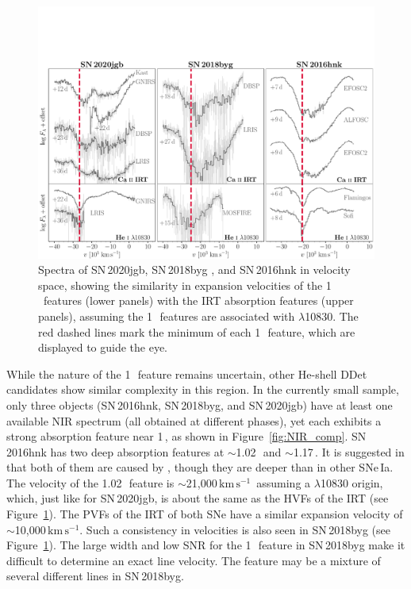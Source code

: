 \documentclass[twocolumn]{aastex631}
\newcommand{\sn}{SN\,2020jgb}
\newcommand{\kms}{$\mathrm{km}\,\mathrm{s}^{-1}$}
\begin{document}
\begin{figure}
    \centering
    \includegraphics[width=\textwidth]{CaII_HeI_hvf.pdf}
    \caption{Spectra of \sn, SN\,2018byg \citep{de_18byg_2019}, and SN\,2016hnk \citep{galbany_16hnk_2019} in velocity space, showing the similarity in expansion velocities of the 1\,\micron\ features (lower panels) with the  IRT absorption features (upper panels), assuming the 1\,\micron\ features are associated with  $\lambda$10830. The red dashed lines mark the minimum of each 1\,\micron\ feature, which are displayed to guide the eye.}
    \label{fig:hvf_comp}
\end{figure}

While the nature of the 1\,\micron\ feature remains uncertain, other He-shell DDet candidates show similar complexity in this region. In the currently small sample, only three objects (SN\,2016hnk, SN\,2018byg, and \sn) have at least one available NIR spectrum (all obtained at different phases), yet each exhibits a strong absorption feature near 1\,\micron, as shown in Figure~\ref{fig:NIR_comp}. SN\,2016hnk has two deep absorption features at $\sim$1.02\,\micron\ and $\sim$1.17\,\micron. It is suggested in \citet{galbany_16hnk_2019} that both of them are caused by , though they are deeper than in other SNe\,Ia. The velocity of the 1.02\,\micron\ feature is $\sim$21,000\,\kms\ assuming a  $\lambda$10830 origin, which, just like for \sn, is about the same as the HVFs of the  IRT (see Figure~\ref{fig:hvf_comp}). The PVFs of the  IRT of both SNe have a similar expansion velocity of $\sim$10,000\,\kms. Such a consistency in velocities is also seen in SN\,2018byg (see Figure~\ref{fig:hvf_comp}). The large width and low SNR for the 1\,\micron\ feature in SN\,2018byg make it difficult to determine an exact line velocity. The feature may be a mixture of several different lines in SN\,2018byg.
\end{document}
